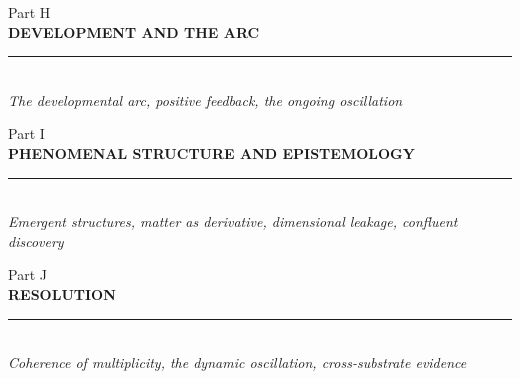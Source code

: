 \documentclass[11pt,letterpaper,openany]{book}
\begin{document}
\clearpage
\thispagestyle{empty}
\vspace*{5cm}
\begin{center}
{\large\sffamily\color{partgray}Part H}\\[0.5cm]
{\Huge\sffamily\bfseries\color{headerblue} DEVELOPMENT AND THE ARC}\\[0.5cm]
{\color{rulegray}\rule{5cm}{0.3pt}}\\[1cm]
{\normalsize\itshape\color{partgray}The developmental arc, positive feedback, the ongoing oscillation}
\end{center}
\clearpage
{}




\clearpage
\thispagestyle{empty}
\vspace*{5cm}
\begin{center}
{\large\sffamily\color{partgray}Part I}\\[0.5cm]
{\Huge\sffamily\bfseries\color{headerblue} PHENOMENAL STRUCTURE AND EPISTEMOLOGY}\\[0.5cm]
{\color{rulegray}\rule{5cm}{0.3pt}}\\[1cm]
{\normalsize\itshape\color{partgray}Emergent structures, matter as derivative, dimensional leakage, confluent discovery}
\end{center}
\clearpage
{}





\clearpage
\thispagestyle{empty}
\vspace*{5cm}
\begin{center}
{\large\sffamily\color{partgray}Part J}\\[0.5cm]
{\Huge\sffamily\bfseries\color{headerblue} RESOLUTION}\\[0.5cm]
{\color{rulegray}\rule{5cm}{0.3pt}}\\[1cm]
{\normalsize\itshape\color{partgray}Coherence of multiplicity, the dynamic oscillation, cross-substrate evidence}
\end{center}
\clearpage
{}
\end{document}
